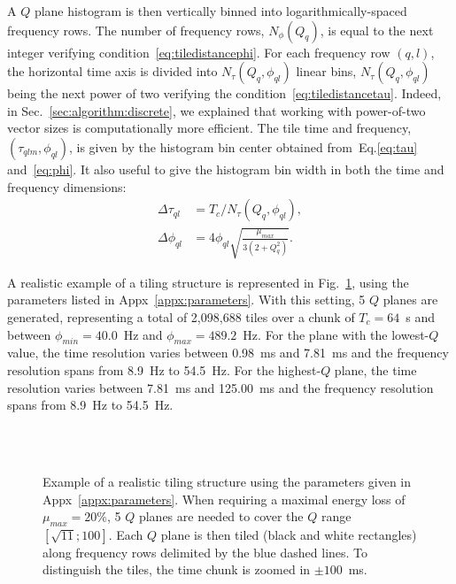 A $Q$ plane histogram is then vertically binned into logarithmically-spaced frequency rows. The number of frequency rows, $N_\phi(Q_q)$, is equal to the next integer verifying condition~\ref{eq:tiledistancephi}. For each frequency row $(q,l)$, the horizontal time axis is divided into $N_\tau(Q_q,\phi_{ql})$ linear bins, $N_\tau(Q_q,\phi_{ql})$ being the next power of two verifying the condition~\ref{eq:tiledistancetau}. Indeed, in Sec.~\ref{sec:algorithm:discrete}, we explained that working with power-of-two vector sizes is computationally more efficient. The tile time and frequency, $(\tau_{qlm}, \phi_{ql})$, is given by the histogram bin center obtained from~Eq.\ref{eq:tau} and~\ref{eq:phi}. It also useful to give the histogram bin width in both the time and frequency dimensions:
\begin{align}
  \Delta\tau_{ql} &= T_c / N_\tau(Q_q, \phi_{ql}), \label{eq:dtau} \\
  \Delta\phi_{ql} &= 4\phi_{ql}\sqrt{\frac{\mu_{max}}{3(2+Q_q^2)}}.\label{eq:dphi}
\end{align}


A realistic example of a tiling structure is represented in Fig.~\ref{fig:tiling}, using the parameters listed in Appx~\ref{appx:parameters}. With this setting, 5 $Q$ planes are generated, representing a total of 2,098,688 tiles over a chunk of $T_c=64$~s and between $\phi_{min}=40.0$~Hz and $\phi_{max}=489.2$~Hz. For the plane with the lowest-$Q$ value, the time resolution varies between 0.98~ms and 7.81~ms and the frequency resolution spans from 8.9~Hz to 54.5~Hz. For the highest-$Q$ plane, the time resolution varies between 7.81~ms and 125.00~ms and the frequency resolution spans from 8.9~Hz to 54.5~Hz.
\begin{figure}
  \center
    \\
    \\
  \caption{Example of a realistic tiling structure using the parameters given in Appx~\ref{appx:parameters}. When requiring a maximal energy loss of $\mu_{max}=20\%$, 5 $Q$ planes are needed to cover the $Q$ range $[\sqrt{11}; 100]$. Each $Q$ plane is then tiled (black and white rectangles) along frequency rows delimited by the blue dashed lines. To distinguish the tiles, the time chunk is zoomed in $\pm 100$~ms.}
  \label{fig:tiling}
\end{figure}

